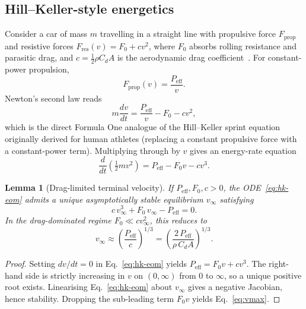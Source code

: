 \documentclass[11pt,twocolumn]{article}
\newtheorem{lemma}[theorem]{Lemma}
\theoremstyle{definition}
\theoremstyle{remark}
\begin{document}
\subsection{Hill--Keller-style energetics}

Consider a car of mass $m$ travelling in a straight line with propulsive force
$F_{\mathrm{prop}}$ and resistive forces
$F_{\mathrm{res}}(v) = F_0 + c v^2$, where $F_0$ absorbs rolling resistance
and parasitic drag, and $c = \tfrac{1}{2}\rho C_d A$ is the aerodynamic drag
coefficient~\cite{anderson2017,hoerner1965,schlichting2017}. For constant-power propulsion,
\[
  F_{\mathrm{prop}}(v) = \frac{P_{\mathrm{eff}}}{v}.
\]
Newton's second law reads
\begin{equation}
  m\frac{dv}{dt} = \frac{P_{\mathrm{eff}}}{v} - F_0 - cv^2,
  \label{eq:hk-eom}
\end{equation}
which is the direct Formula One analogue of the Hill--Keller sprint
equation~\cite{hill1925,keller1973} originally derived for human athletes (replacing a constant propulsive force
with a constant-power term). Multiplying through by $v$ gives an energy-rate
equation
\begin{equation}
  \frac{d}{dt}\!\left(\tfrac{1}{2} m v^2\right)
  = P_{\mathrm{eff}} - F_0 v - c v^3.
  \label{eq:energy-rate}
\end{equation}

\begin{lemma}[Drag-limited terminal velocity]
\label{lem:vmax}
If $P_{\mathrm{eff}}, F_0, c > 0$, the ODE~\eqref{eq:hk-eom} admits a unique
asymptotically stable equilibrium $v_\infty$ satisfying
\begin{equation}
  c\, v_\infty^3 + F_0\, v_\infty - P_{\mathrm{eff}} = 0.
  \label{eq:vinfty}
\end{equation}
In the drag-dominated regime $F_0 \ll c v_\infty^2$, this reduces to
\begin{equation}
  v_\infty \approx \left(\frac{P_{\mathrm{eff}}}{c}\right)^{1/3}
  = \left(\frac{2\,P_{\mathrm{eff}}}{\rho\, C_d A}\right)^{1/3}.
  \label{eq:vmax}
\end{equation}
\end{lemma}

\begin{proof}
Setting $dv/dt = 0$ in Eq.~\eqref{eq:hk-eom} yields
$P_{\mathrm{eff}} = F_0 v + c v^3$. The right-hand side is strictly increasing
in $v$ on $(0, \infty)$ from $0$ to $\infty$, so a unique positive root exists.
Linearising Eq.~\eqref{eq:hk-eom} about $v_\infty$ gives a negative Jacobian,
hence stability. Dropping the sub-leading term $F_0 v$ yields
Eq.~\eqref{eq:vmax}.
\end{proof}
\end{document}
